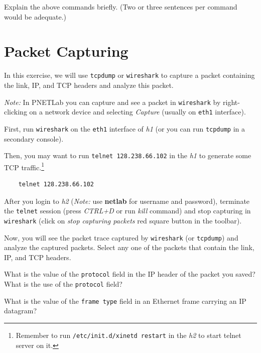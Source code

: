 \documentclass{UTNetLab}
\begin{document}
\begin{report}
    \item Explain the above commands briefly.
    (Two or three sentences per command would be adequate.)
\end{report}

\section{Packet Capturing}
In this exercise, we will use \lstinline{tcpdump} or \lstinline{wireshark} to capture a packet containing the link, IP, and TCP headers and analyze this packet.

\textit{Note:} In PNETLab you can capture and see a packet in \lstinline{wireshark} by right-clicking on a network device and selecting \textit{Capture} (usually on \texttt{eth1} interface).

First, run \lstinline{wireshark} on the \texttt{eth1} interface of \textit{h1} (or you can run \lstinline{tcpdump} in a secondary console).

Then, you may want to run \lstinline{telnet 128.238.66.102} in the \textit{h1} to generate some TCP traffic.\footnote{Remember to run \lstinline{/etc/init.d/xinetd restart} in the \textit{h2} to start telnet server on it.}

\begin{lstlisting}
	telnet 128.238.66.102
\end{lstlisting}

After you login to \textit{h2} (\textit{Note:} use \textbf{netlab} for username and password), terminate the \lstinline{telnet} session (press \textit{CTRL+D} or run \textit{kill} command) and stop capturing in \lstinline{wireshark} (click on \textit{stop capturing packets} red square button in the toolbar).


Now, you will see the packet trace captured by \lstinline{wireshark} (or \lstinline{tcpdump}) and analyze the captured packets. Select any one of the packets that contain the link, IP, and TCP headers.


\begin{report}
    \item What is the value of the \texttt{protocol} field in the IP header of the packet you saved?
    What is the use of the \texttt{protocol} field?

    \item What is the value of the \texttt{frame type} field in an Ethernet frame carrying an IP datagram?
\end{report}
\end{document}
